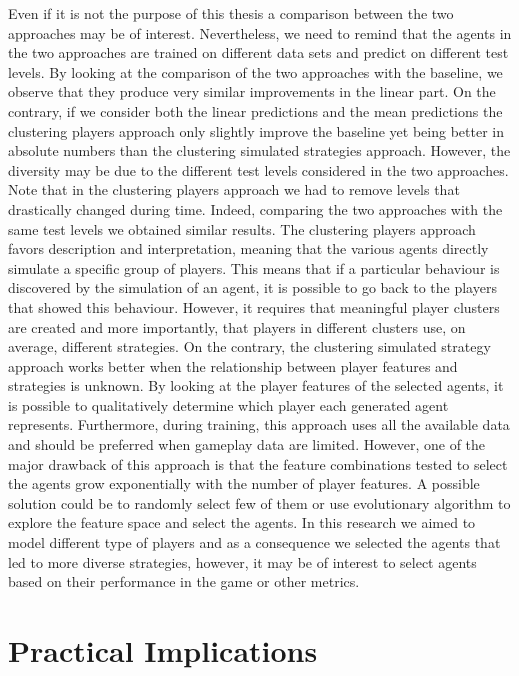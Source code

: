 Even if it is not the purpose of this thesis a comparison between the two approaches may be of interest. Nevertheless, we need to remind that the agents in the two approaches are trained on different data sets and predict on different test levels.
By looking at the comparison of the two approaches with the baseline, we observe that they produce very similar improvements in the linear part. On the contrary, if we consider both the linear predictions and the mean predictions the clustering players approach only slightly improve the baseline yet being better in absolute numbers than the clustering simulated strategies approach. However, the diversity may be due to the different test levels considered in the two approaches. Note that in the clustering players approach we had to remove levels that drastically changed during time. Indeed, comparing the two approaches with the same test levels we obtained similar results.
The clustering players approach favors description and interpretation, meaning that the various agents directly simulate a specific group of players. This means that if a particular behaviour is discovered by the simulation of an agent, it is possible to go back to the players that showed this behaviour. However, it requires that meaningful player clusters are created and more importantly, that players in different clusters use, on average, different strategies. On the contrary, the clustering simulated strategy approach works better when the relationship between player features and strategies is unknown. By looking at the player features of the selected agents, it is possible to qualitatively determine which player each generated agent represents. Furthermore, during training, this approach uses all the available data and should be preferred when gameplay data are limited. However, one of the major drawback of this approach is that the feature combinations tested to select the agents grow exponentially with the number of player features. A possible solution could be to randomly select few of them or use evolutionary algorithm to explore the feature space and select the agents. In this research we aimed to model different type of players and as a consequence we selected the agents that led to more diverse strategies, however, it may be of interest to select agents based on their performance in the game or other metrics.

\section{Practical Implications}

